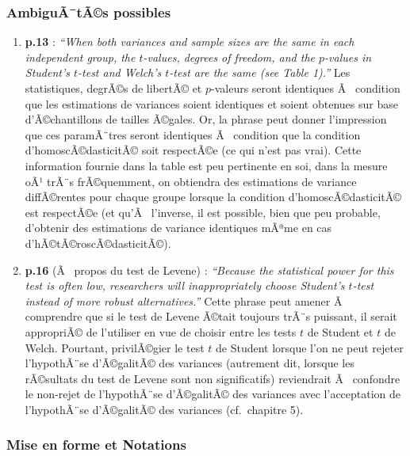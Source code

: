 \begin{appendix}
\hypertarget{ambiguuxe3tuxe3s-possibles}{%
\subsubsection{AmbiguÃ¯tÃ©s
possibles}\label{ambiguuxe3tuxe3s-possibles}}

\begin{enumerate}
\def\labelenumi{\arabic{enumi})}
\item
  \textbf{p.13} : \emph{``When both variances and sample sizes are the
  same in each independent group, the \(t\)-values, degrees of freedom,
  and the \(p\)-values in Student's \(t\)-test and Welch's \(t\)-test
  are the same (see Table 1).''} Les statistiques, degrÃ©s de libertÃ©
  et \(p\)-valeurs seront identiques Ã~ condition que les \color{blue}
  estimations de variances soient identiques \color{black} et soient
  obtenues sur base \color{blue} d'Ã©chantillons de tailles
  Ã©gales\color{black}. Or, la phrase peut donner l'impression que ces
  paramÃ¨tres seront identiques Ã~ condition que la condition
  d'homoscÃ©dasticitÃ© soit respectÃ©e (ce qui n'est pas vrai). Cette
  information fournie dans la table est peu pertinente en soi, dans la
  mesure oÃ¹ trÃ¨s frÃ©quemment, on obtiendra des estimations de
  variance diffÃ©rentes pour chaque groupe lorsque la condition
  d'homoscÃ©dasticitÃ© est respectÃ©e (et qu'Ã~ l'inverse, il est
  possible, bien que peu probable, d'obtenir des estimations de variance
  identiques mÃªme en cas d'hÃ©tÃ©roscÃ©dasticitÃ©).
\item
  \textbf{p.16} (Ã~ propos du test de Levene) : \emph{``Because the
  statistical power for this test is often low, researchers will
  inappropriately choose Student's \(t\)-test instead of more robust
  alternatives.''} Cette phrase peut amener Ã~ comprendre que si le test
  de Levene Ã©tait toujours trÃ¨s puissant, il serait appropriÃ© de
  l'utiliser en vue de choisir entre les tests \(t\) de Student et \(t\)
  de Welch. Pourtant, privilÃ©gier le test \(t\) de Student lorsque l'on
  ne peut rejeter l'hypothÃ¨se d'Ã©galitÃ© des variances (autrement dit,
  lorsque les rÃ©sultats du test de Levene sont non significatifs)
  reviendrait Ã~ confondre le non-rejet de l'hypothÃ¨se d'Ã©galitÃ© des
  variances avec l'acceptation de l'hypothÃ¨se d'Ã©galitÃ© des variances
  (cf.~chapitre 5).
\end{enumerate}

\hypertarget{mise-en-forme-et-notations}{%
\subsubsection{Mise en forme et
Notations}\label{mise-en-forme-et-notations}}


\end{appendix}
